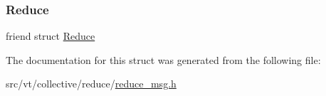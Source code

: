 \subsubsection{\texorpdfstring{Reduce}{Reduce}}
{\footnotesize\ttfamily friend struct \hyperlink{structvt_1_1collective_1_1reduce_1_1_reduce}{Reduce}\hspace{0.3cm}{\ttfamily [friend]}}



The documentation for this struct was generated from the following file\+:\begin{DoxyCompactItemize}
\item 
src/vt/collective/reduce/\hyperlink{reduce__msg_8h}{reduce\+\_\+msg.\+h}\end{DoxyCompactItemize}
